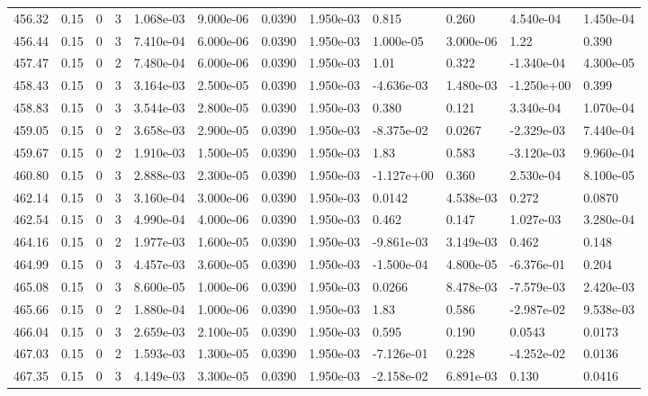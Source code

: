 \documentclass[preview]{standalone}
\begin{document}
{{{{{{{{{{{{{{\begin{tabular}{L{1.2cm}C{1.2cm} C{0.3cm}C{0.5cm} C{1.4cm}C{1.4cm} C{1.4cm}C{1.4cm} C{1.6cm}C{1.6cm} C{1.6cm}C{1.6cm}}
  456.32  &  0.15  & 0     &  3 &  1.068e-03  & 9.000e-06  &  0.0390&   1.950e-03& 0.815 & 0.260   &  4.540e-04 & 1.450e-04  \\ 
  456.44  &  0.15  & 0     &  3 &  7.410e-04  & 6.000e-06  &  0.0390&   1.950e-03& 1.000e-05 & 3.000e-06   &  1.22 & 0.390  \\ 
  457.47  &  0.15  & 0     &  2 &  7.480e-04  & 6.000e-06  &  0.0390&   1.950e-03& 1.01 & 0.322   &  -1.340e-04 & 4.300e-05  \\ 
  458.43  &  0.15  & 0     &  3 &  3.164e-03  & 2.500e-05  &  0.0390&   1.950e-03& -4.636e-03 & 1.480e-03   &  -1.250e+00 & 0.399  \\ 
  458.83  &  0.15  & 0     &  3 &  3.544e-03  & 2.800e-05  &  0.0390&   1.950e-03& 0.380 & 0.121   &  3.340e-04 & 1.070e-04  \\ 
  459.05  &  0.15  & 0     &  2 &  3.658e-03  & 2.900e-05  &  0.0390&   1.950e-03& -8.375e-02 & 0.0267   &  -2.329e-03 & 7.440e-04  \\ 
  459.67  &  0.15  & 0     &  2 &  1.910e-03  & 1.500e-05  &  0.0390&   1.950e-03& 1.83 & 0.583   &  -3.120e-03 & 9.960e-04  \\ 
  460.80  &  0.15  & 0     &  3 &  2.888e-03  & 2.300e-05  &  0.0390&   1.950e-03& -1.127e+00 & 0.360   &  2.530e-04 & 8.100e-05  \\ 
  462.14  &  0.15  & 0     &  3 &  3.160e-04  & 3.000e-06  &  0.0390&   1.950e-03& 0.0142 & 4.538e-03   &  0.272 & 0.0870  \\ 
  462.54  &  0.15  & 0     &  3 &  4.990e-04  & 4.000e-06  &  0.0390&   1.950e-03& 0.462 & 0.147   &  1.027e-03 & 3.280e-04  \\ 
  464.16  &  0.15  & 0     &  2 &  1.977e-03  & 1.600e-05  &  0.0390&   1.950e-03& -9.861e-03 & 3.149e-03   &  0.462 & 0.148  \\ 
  464.99  &  0.15  & 0     &  3 &  4.457e-03  & 3.600e-05  &  0.0390&   1.950e-03& -1.500e-04 & 4.800e-05   &  -6.376e-01 & 0.204  \\ 
  465.08  &  0.15  & 0     &  3 &  8.600e-05  & 1.000e-06  &  0.0390&   1.950e-03& 0.0266 & 8.478e-03   &  -7.579e-03 & 2.420e-03  \\ 
  465.66  &  0.15  & 0     &  2 &  1.880e-04  & 1.000e-06  &  0.0390&   1.950e-03& 1.83 & 0.586   &  -2.987e-02 & 9.538e-03  \\ 
  466.04  &  0.15  & 0     &  3 &  2.659e-03  & 2.100e-05  &  0.0390&   1.950e-03& 0.595 & 0.190   &  0.0543 & 0.0173  \\ 
  467.03  &  0.15  & 0     &  2 &  1.593e-03  & 1.300e-05  &  0.0390&   1.950e-03& -7.126e-01 & 0.228   &  -4.252e-02 & 0.0136  \\ 
  467.35  &  0.15  & 0     &  3 &  4.149e-03  & 3.300e-05  &  0.0390&   1.950e-03& -2.158e-02 & 6.891e-03   &  0.130 & 0.0416  \\ 
\hline 
\end{tabular} 

}}}}}}}}}}}}}}
\end{document}
